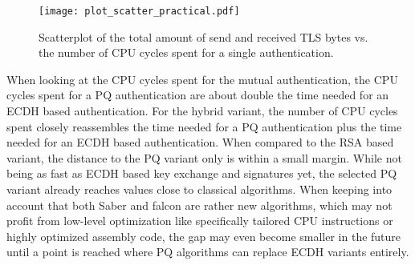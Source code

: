 \begin{figure}[t]
    \centering\texttt{[image: plot\_scatter\_practical.pdf]}
    \caption{Scatterplot of the total amount of send and received TLS bytes vs. the number of CPU cycles spent for a single authentication. }\label{fig:plot_scatter_practical.pdf}
\end{figure}
When looking at the CPU cycles spent for the mutual authentication, the \acs{CPU} cycles spent for a PQ authentication are about double the time needed for an \ac{ECDH} based authentication. For the hybrid variant, the number of CPU cycles spent closely reassembles the time needed for a PQ authentication plus the time needed for an \ac{ECDH} based authentication. When compared to the RSA based variant, the distance to the \ac{PQ} variant only is within a small margin. While not being as fast as \ac{ECDH} based key exchange and signatures yet, the selected \ac{PQ} variant already reaches values close to classical algorithms. When keeping into account that both Saber and falcon are rather new algorithms, which may not profit from low-level optimization like specifically tailored CPU instructions or highly optimized assembly code, the gap may even become smaller in the future until a point is reached where \ac{PQ} algorithms can replace \ac{ECDH} variants entirely. 

\endinput
